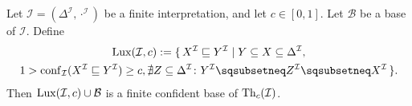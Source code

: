 \begin{Theorem}
  \label{thm:luxenbuger-base-for-gcis}
  Let $\mathcal{I} = (\Delta^{\mathcal{I}}, \cdot^{\mathcal{I}})$ be a finite
  interpretation, and let $c \in [0,1]$.  Let $\mathcal{B}$ be a base of $\mathcal{I}$.  Define
  \begin{multline*}
    \Lux(\mathcal{I}, c) := \{\, X^{\mathcal{I}} \sqsubseteq Y^{\mathcal{I}} \mid Y
      \subseteq X \subseteq \Delta^{\mathcal{I}}, \\
      1 > \conf_{\mathcal{I}}( X^{\mathcal{I}} \sqsubseteq Y^{\mathcal{I}} ) \ge c,
      \nexists Z \subseteq \Delta^{\mathcal{I}} \st Y^{\mathcal{I}} \sqsubsetneq
      Z^{\mathcal{I}} \sqsubsetneq X^{\mathcal{I}} \,\}.
  \end{multline*}
  Then $\operatorname{Lux}(\mathcal{I}, c) \cup \mathcal{B}$ is a finite confident base of
  $\operatorname{Th}_c(\mathcal{I})$.
\end{Theorem}
